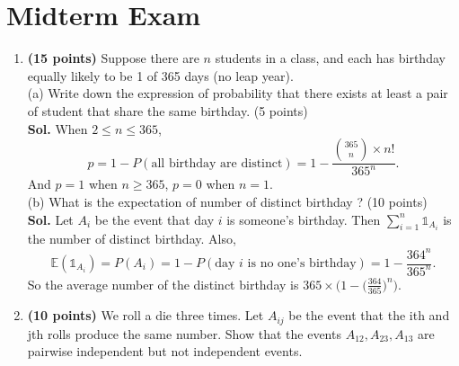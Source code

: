 \section*{Midterm Exam}
\begin{enumerate}
    \item \textbf{(15 points)} Suppose there are \(n\) students in a class, and each has birthday equally likely to be 1 of 365 days (no leap year).\\
    (a) Write down the expression of probability that there exists at least a pair of student that share the same birthday. (5 points)\\
    \textbf{Sol.} When $2\leq n\leq 365$,
\begin{equation*}    
    p=1-P(\text{all birthday are distinct})=1-\frac{\binom{365}{n}\times n!}{365^n}.
    \end{equation*}
    And $p=1$ when $n\geq 365$, $p=0$ when $n=1$.
    \\
    (b) What is the expectation of number of distinct birthday ? (10 points)\\
    \textbf{Sol.} Let $A_i$ be the event that day $i$ is someone's birthday. Then $\sum_{i=1}^n\mathds{1}_{A_i}$ is the number of distinct birthday. Also,
\begin{equation*}    
\mathbb{E}(\mathds{1}_{A_i})=P(A_i)=1-P(\text{day $i$ is no one's birthday})=1-\frac{364^n}{365^n}.
\end{equation*}
So the average number of the distinct birthday is $365\times\big(1-\big(\frac{364}{365}\big)^n\big)$.

    \item \textbf{(10 points)} We roll a die three times. Let \(A_{ij}\) be the event that the ith and jth rolls produce the same number.
    Show that the events \(A_{12}, A_{23}, A_{13}\) are pairwise independent but not independent events.


\end{enumerate}
